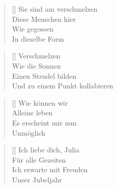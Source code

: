 \documentclass[twocolumn]{article}
\newenvironment{Strophe}{\begin{minipage}{\versewidth} \begin{verse}[\versewidth]}{\end{verse} \end{minipage}\vspace{0.6em}}
\begin{document}
	\begin{Strophe}	
		Sie sind am verschmelzen \\
		Diese Menschen hier \\
		Wie gegossen \\
		In dieselbe Form \\
	\end{Strophe}
	
	\begin{Strophe}
		Verschmelzen \\
		Wie die Sonnen \\
		Einen Strudel bilden \\
		Und zu einem Punkt kollabieren \\
	\end{Strophe}
	
	\begin{Strophe}
		Wie können wir \\
		Alleine leben \\
		Es erscheint mir nun \\
		Unmöglich \\
	\end{Strophe}
	
	\begin{Strophe}
		Ich liebe dich, Julia \\
		Für alle Gezeiten \\
		Ich erwarte mit Freuden \\
		Unser Jubeljahr \\
	\end{Strophe}
\end{document}

